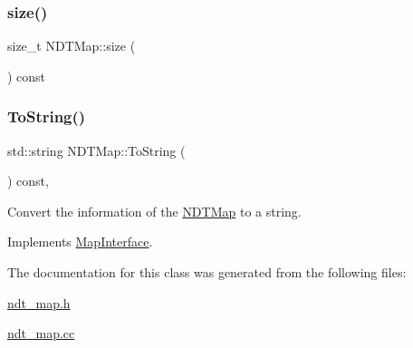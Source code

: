 \subsubsection{\texorpdfstring{size()}{size()}}
{\footnotesize\ttfamily size\+\_\+t N\+D\+T\+Map\+::size (\begin{DoxyParamCaption}{ }\end{DoxyParamCaption}) const\hspace{0.3cm}{\ttfamily [inline]}}

\mbox{\label{classNDTMap_a355a32d48208aa5bcc361b4be1d6320c}} 
\subsubsection{\texorpdfstring{To\+String()}{ToString()}}
{\footnotesize\ttfamily std\+::string N\+D\+T\+Map\+::\+To\+String (\begin{DoxyParamCaption}{ }\end{DoxyParamCaption}) const\hspace{0.3cm}{\ttfamily [override]}, {\ttfamily [virtual]}}



Convert the information of the \hyperlink{classNDTMap}{N\+D\+T\+Map} to a string. 



Implements \hyperlink{classMapInterface_a87b132e1a619eb21e0ac684fc25f8c74}{Map\+Interface}.



The documentation for this class was generated from the following files\+:\begin{DoxyCompactItemize}
\item 
\hyperlink{ndt__map_8h}{ndt\+\_\+map.\+h}\item 
\hyperlink{ndt__map_8cc}{ndt\+\_\+map.\+cc}\end{DoxyCompactItemize}
